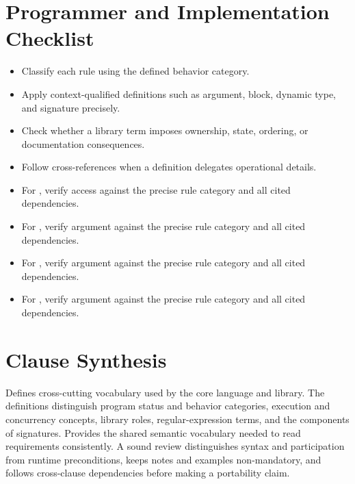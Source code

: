 \documentclass[11pt,letterpaper]{article}
\begin{document}
\section{Programmer and Implementation Checklist}
\begin{CornellReferenceChecklistBox}\begin{itemize}[label=$\square$]
\item Classify each rule using the defined behavior category.
\item Apply context-qualified definitions such as argument, block, dynamic type, and signature precisely.
\item Check whether a library term imposes ownership, state, ordering, or documentation consequences.
\item Follow cross-references when a definition delegates operational details.
\item For , verify access against the precise rule category and all cited dependencies.
\item For , verify argument against the precise rule category and all cited dependencies.
\item For , verify argument against the precise rule category and all cited dependencies.
\item For , verify argument against the precise rule category and all cited dependencies.
\end{itemize}\end{CornellReferenceChecklistBox}
\section{Clause Synthesis}
\begin{CornellReferenceOrientationBox}Defines cross-cutting vocabulary used by the core language and library. The definitions distinguish program status and behavior categories, execution and concurrency concepts, library roles, regular-expression terms, and the components of signatures. Provides the shared semantic vocabulary needed to read requirements consistently. A sound review distinguishes syntax and participation from runtime preconditions, keeps notes and examples non-mandatory, and follows cross-clause dependencies before making a portability claim.\end{CornellReferenceOrientationBox}
\end{document}
